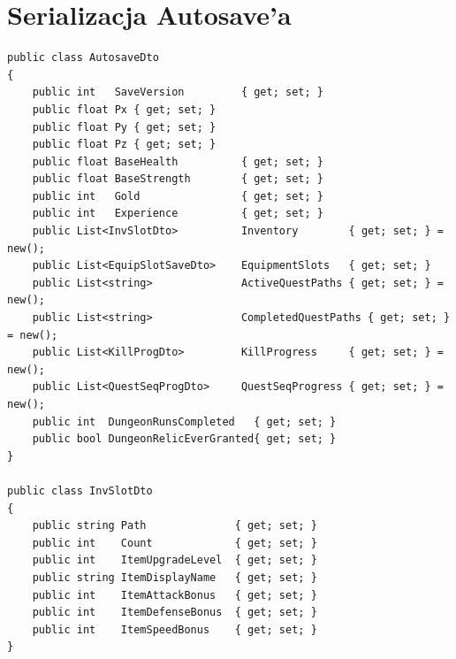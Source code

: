 \section{Serializacja Autosave'a}

\begin{lstlisting}[caption={SaveGameService - struktury DTO dla autosave},label={lst:save}]
public class AutosaveDto
{
    public int   SaveVersion         { get; set; }
    public float Px { get; set; }
    public float Py { get; set; }
    public float Pz { get; set; }
    public float BaseHealth          { get; set; }
    public float BaseStrength        { get; set; }
    public int   Gold                { get; set; }
    public int   Experience          { get; set; }
    public List<InvSlotDto>          Inventory        { get; set; } = new();
    public List<EquipSlotSaveDto>    EquipmentSlots   { get; set; }
    public List<string>              ActiveQuestPaths { get; set; } = new();
    public List<string>              CompletedQuestPaths { get; set; } = new();
    public List<KillProgDto>         KillProgress     { get; set; } = new();
    public List<QuestSeqProgDto>     QuestSeqProgress { get; set; } = new();
    public int  DungeonRunsCompleted   { get; set; }
    public bool DungeonRelicEverGranted{ get; set; }
}

public class InvSlotDto
{
    public string Path              { get; set; }
    public int    Count             { get; set; }
    public int    ItemUpgradeLevel  { get; set; }
    public string ItemDisplayName   { get; set; }
    public int    ItemAttackBonus   { get; set; }
    public int    ItemDefenseBonus  { get; set; }
    public int    ItemSpeedBonus    { get; set; }
}
\end{lstlisting}
